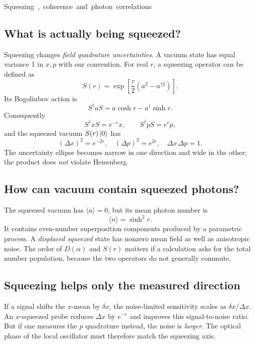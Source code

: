 \unit{Squeezing, coherence and photon correlations}
\subsection{What is actually being squeezed?}
Squeezing changes \emph{field quadrature
uncertainties}. A vacuum state has equal
variance 1 in \(x,p\) with our convention.
For real \(r\), a squeezing operator can be defined as
\[
S(r)=\exp\left[\frac r2(a^2-a^{\dagger2})\right].
\]
Its Bogoliubov action is
\[
S^\dagger aS=a\cosh r-a^\dagger\sinh r.
\]
Consequently
\[
S^\dagger xS=e^{-r}x,\qquad
S^\dagger pS=e^{r}p,
\]
and the squeezed vacuum \(S(r)\left\lvert 0\right\rangle\) has
\[
\boxed{(\Delta x)^2=e^{-2r},\quad
(\Delta p)^2=e^{2r},\quad
\Delta x\,\Delta p=1.}
\]
The uncertainty ellipse becomes narrow in
one direction and wide in the other;
the product does \emph{not} violate Heisenberg.

\begin{center}
\end{center}

\subsection{How can vacuum contain squeezed photons?}
The squeezed vacuum has
\(\langle a\rangle=0\), but its mean
photon number is
\[
\boxed{\langle n\rangle=\sinh^2r.}
\]
It contains even-number superposition components
produced by a parametric process.
A \emph{displaced squeezed} state has nonzero
mean field as well as anisotropic noise.
The order of \(D(\alpha)\) and \(S(r)\)
matters if a calculation asks for the
total number population, because
the two operators do not generally commute.

\subsection{Squeezing helps only the measured direction}
If a signal shifts the \(x\)-mean by
\(\delta x\), the noise-limited sensitivity
scales as \(\delta x/\Delta x\).
An \(x\)-squeezed probe reduces
\(\Delta x\) by \(e^{-r}\) and improves this
signal-to-noise ratio. But if one measures
the \(p\) quadrature instead, the noise
is \emph{larger}. The optical phase of
the local oscillator must therefore
match the squeezing axis.

